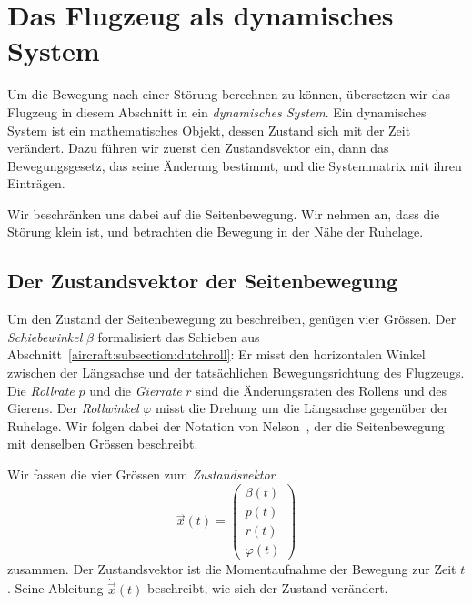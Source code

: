 \section{Das Flugzeug als dynamisches System
\label{aircraft:section:system}}
Um die Bewegung nach einer Störung berechnen zu können, übersetzen wir
das Flugzeug in diesem Abschnitt in ein \emph{dynamisches System}.
Ein dynamisches System ist ein mathematisches Objekt, dessen Zustand sich mit
der Zeit verändert.
Dazu führen wir zuerst den Zustandsvektor ein, dann das
Bewegungsgesetz, das seine Änderung bestimmt, und die Systemmatrix mit ihren
Einträgen.

Wir beschränken uns dabei auf die Seitenbewegung.
Wir nehmen an, dass die Störung klein ist, und betrachten die
Bewegung in der Nähe der Ruhelage.

\subsection{Der Zustandsvektor der Seitenbewegung
\label{aircraft:subsection:zustandsvektor}}
Um den Zustand der Seitenbewegung zu beschreiben, genügen vier Grössen.
Der \emph{Schiebewinkel} $\beta$ formalisiert das Schieben aus
Abschnitt~\ref{aircraft:subsection:dutchroll}:
Er misst den horizontalen Winkel zwischen der Längsachse und der tatsächlichen
Bewegungsrichtung des Flugzeugs.
Die \emph{Rollrate} $p$ und die \emph{Gierrate} $r$ sind die
Änderungsraten des Rollens und des Gierens.
Der \emph{Rollwinkel} $\varphi$ misst die Drehung um die Längsachse
gegenüber der Ruhelage.
Wir folgen dabei der Notation von Nelson~\cite{aircraft:nelson}, der
die Seitenbewegung mit denselben Grössen beschreibt.

Wir fassen die vier Grössen zum \emph{Zustandsvektor}
%
\begin{equation}
    \vec{x}(t)
    =
    \begin{pmatrix}
        \beta(t) \\ p(t) \\ r(t) \\ \varphi(t)
    \end{pmatrix}
    \label{aircraft:eqn:zustandsvektor}
\end{equation}
zusammen.
Der Zustandsvektor ist die Momentaufnahme der Bewegung zur Zeit $t$.
Seine Ableitung $\dot{\vec{x}}(t)$ beschreibt, wie sich der Zustand
verändert.


